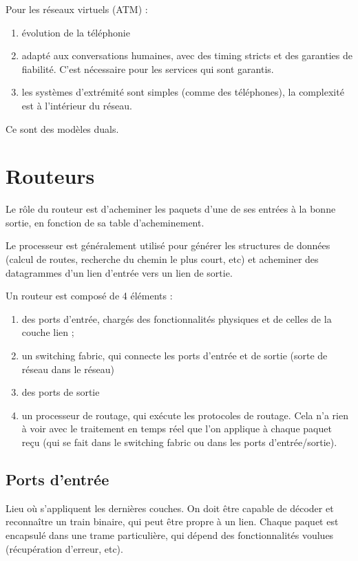 	
	Pour les réseaux virtuels (ATM) :		
	\begin{enumerate}
		\item évolution de la téléphonie
		\item adapté aux conversations humaines, avec des timing stricts et des garanties de fiabilité. C'est nécessaire pour les services qui sont garantis.
		\item les systèmes d'extrémité sont simples (comme des téléphones), la complexité est à l'intérieur du réseau.
	\end{enumerate}
		

	Ce sont des modèles duals.
	
\section{Routeurs}

Le rôle du routeur est d'acheminer les paquets d'une de ses entrées à la bonne sortie, en fonction de sa table d'acheminement.

Le processeur est généralement utilisé pour générer les structures de données (calcul de routes, recherche du chemin le plus court, etc) et acheminer des datagrammes d'un lien d'entrée vers un lien de sortie.



Un routeur est composé de 4 éléments :

\begin{enumerate}
	\item des ports d'entrée, chargés des fonctionnalités physiques et de celles de la couche lien ;
	\item un switching fabric, qui connecte les ports d'entrée et de sortie (sorte de réseau dans le réseau)
	\item des ports de sortie
	\item un processeur de routage, qui exécute les protocoles de routage. Cela n'a rien à voir avec le traitement en temps réel que l'on applique à chaque paquet reçu (qui se fait dans le switching fabric ou dans les ports d'entrée/sortie).
\end{enumerate}

	\subsection{Ports d'entrée}
	
	Lieu où s'appliquent les dernières couches. On doit être capable de décoder et reconnaître un train binaire, qui peut être propre à un lien. Chaque paquet est encapsulé dans une trame particulière, qui dépend des fonctionnalités voulues (récupération d'erreur, etc).
	

